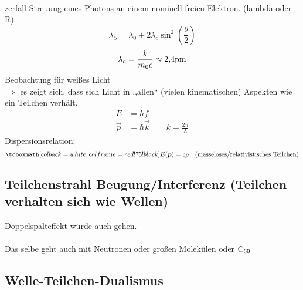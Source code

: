 \\zerfall
Streuung eines Photons an einem nominell freien Elektron.
\hfw (lambda oder R)
\begin{equation*}
\lambda_S = \lambda_0 + 2 \lambda_c \sin^2 \left(\frac{\theta}{2}\right)
\end{equation*}
\begin{equation*}
\lambda_c = \frac{k}{m_0c} \approx 2{,}4 \textrm{pm}
\end{equation*}
Beobachtung für weißes Licht\\[5pt]
$ \Rightarrow $ es zeigt sich, dass sich Licht in ,,allen`` (vielen kinematischen) Aspekten wie ein Teilchen verhält.
\begin{align*}
E &= hf\\
\vec{p} &= \hbar \vec{k} \qquad k = \frac{2 \pi}{\lambda}
\end{align*}
Dispersionsrelation:
\begin{equation*}
\rmbox{E(\vec{p}) = cp} \quad (\tx{masseloses/relativistisches Teilchen})
\end{equation*}

\subsection{Teilchenstrahl Beugung/Interferenz (Teilchen verhalten sich wie Wellen)}

Doppelspalteffekt würde auch gehen.\\
\\[10pt]
Das selbe geht auch mit Neutronen oder großen Molekülen oder $ \textrm{C}_{60} $\\

\subsection{Welle-Teilchen-Dualismus}

